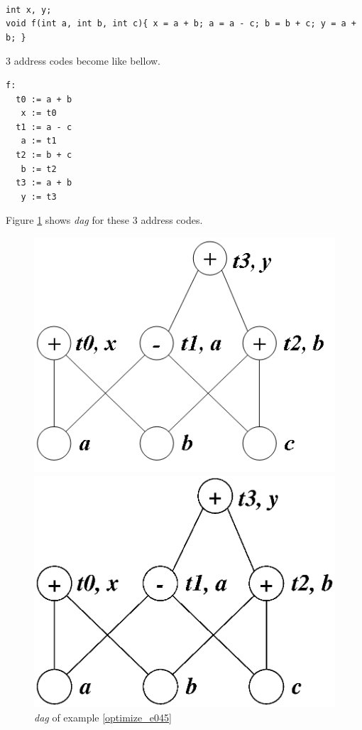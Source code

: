 \begin{Example}
\label{optimize_e045}
\begin{verbatim}

int x, y;
void f(int a, int b, int c){ x = a + b; a = a - c; b = b + c; y = a + b; }
\end{verbatim}
3 address codes become like bellow.
\begin{verbatim}
f:
  t0 := a + b
   x := t0
  t1 := a - c
   a := t1
  t2 := b + c
   b := t2
  t3 := a + b
   y := t3
\end{verbatim}
Figure \ref{optimize_e046} shows {\em dag} for these 3 address codes.
\begin{figure}[htbp]
\begin{center}
\begin{htmlonly}
\includegraphics[width=0.7\linewidth,height=0.540\linewidth]{opt024.png}
\end{htmlonly}
\begin{latexonly}
\includegraphics[width=0.7\linewidth,height=0.540\linewidth]{opt024.eps}
\end{latexonly}
\caption{{\em dag} of example \ref{optimize_e045}}
\label{optimize_e046}
\end{center}

\end{figure}
\end{Example}
